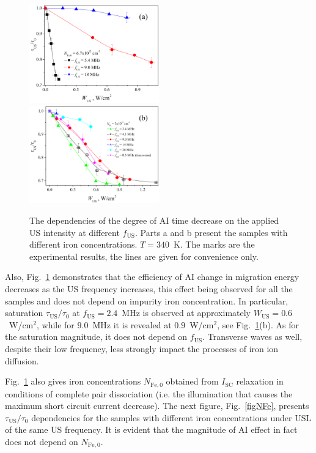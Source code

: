 \begin{figure}
 \includegraphics[width=0.5\textwidth]{Fig4a}
 \includegraphics[width=0.5\textwidth]{Fig4b}
\caption{
The dependencies of the degree of AI time decrease on the applied US intensity at different $f_\mathrm{US}$.
Parts a and b present the samples with different iron concentrations.
$T=340$~K.
The marks are the experimental results, the lines are given for convenience only.
}
\label{figfus}       %
\end{figure}

Also, Fig.~\ref{figfus} demonstrates that the efficiency of
AI change in migration energy decreases as the US frequency increases,
this effect being observed for all the samples and does not depend on impurity iron concentration.
In particular, saturation $\tau_\mathrm{US}/\tau_{0}$ at $f_\mathrm{US}=2.4$~MHz is observed
at approximately $W_\mathrm{US}=0.6$~W/cm$^2$,
while for $9.0$~MHz it is revealed at $0.9$~W/cm$^2$, see Fig.~\ref{figfus}(b).
As for the saturation magnitude, it does not depend on $f_\mathrm{US}$.
Transverse waves as well, despite their low frequency, less strongly impact the processes of iron ion diffusion.

Fig.~\ref{figfus} also gives iron concentrations $N_\mathrm{Fe,0}$ obtained from $I_\mathrm{SC}$ relaxation
in conditions of complete pair dissociation (i.e. the illumination that causes the maximum short circuit current decrease).
The next figure, Fig.~\ref{figNFe}, presents $\tau_\mathrm{US}/\tau_{0}$  dependencies
for the samples with different iron concentrations under USL of the same US frequency.
It is evident that the magnitude of AI effect in fact does not depend on $N_\mathrm{Fe,0}$.

